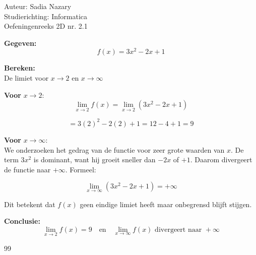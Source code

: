 \documentclass[a4paper]{article}
\begin{document}
\noindent \large Auteur: Sadia Nazary \\
\noindent \large Studierichting: Informatica \\
\noindent \large Oefeningenreeks 2D nr. 2.1 \\

\medskip

\normalsize

\textbf{Gegeven:} \\

$$ f(x) = 3x^2 - 2x + 1 $$

\textbf{Bereken:} \\

De limiet voor $x \to 2$ en $x \to \infty$

\bigskip

\textbf{Voor } $x \to 2$: \\

$$ \lim\limits_{x \to 2} f(x) = \lim\limits_{x \to 2} (3x^2 - 2x + 1) $$

$$ = 3(2)^2 - 2(2) + 1 = 12 - 4 + 1 = 9 $$

\bigskip

\textbf{Voor } $x \to \infty$: \\

We onderzoeken het gedrag van de functie voor zeer grote waarden van $x$. De term $3x^2$ is dominant, want hij groeit sneller dan $-2x$ of $+1$. Daarom divergeert de functie naar $+\infty$. Formeel:

$$ \lim\limits_{x \to \infty} (3x^2 - 2x + 1) = +\infty $$

Dit betekent dat $f(x)$ geen eindige limiet heeft maar onbegrensd blijft stijgen.

\bigskip

\textbf{Conclusie:} \\

$$
\lim\limits_{x \to 2} f(x) = 9 \quad \text{en} \quad \lim\limits_{x \to \infty} f(x) \text{ divergeert naar } +\infty
$$

\begin{thebibliography}{99}
\end{thebibliography}
\end{document}
